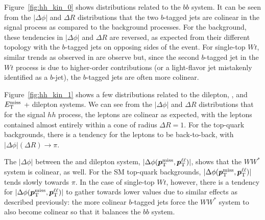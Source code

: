 Figure~\ref{fig:hh_kin_0} shows distributions related to the $bb$ system.
It can be seen from the $|\Delta \phi|$ and $\Delta R$ distributions that the two $b$-tagged jets
are colinear in the signal process as compared to the background processes.
For the \ttbar background, these tendencies in $|\Delta \phi|$ and $\Delta R$ are reversed,
as expected from their different topology with the $b$-tagged jets on opposing sides of the event.
For single-top $Wt$, similar trends as observed in \ttbar are observe but, since the second $b$-tagged
jet in the $Wt$ process is due to higher-order contributions (or a light-flavor jet mistakenly identified as a $b$-jet),
the $b$-tagged jets are often more colinear.

Figure~\ref{fig:hh_kin_1} shows a few distributions related to the dilepton, \met, and $E_{\text{T}}^{\text{miss}}$ + dilepton systems.
We can see from the $|\Delta \phi|$ and $\Delta R$ distributions that for the signal $hh$ process, the leptons
are colinear as expected, with the leptons contained almost entirely within a cone of radius $\Delta R = 1$.
For the top-quark backgrounds, there is a tendency for the leptons to be back-to-back, with $|\Delta \phi| (\Delta R) \rightarrow \pi$.

The $|\Delta \phi|$ between the \met and dilepton system, $|\Delta \phi (\bm{p}_{\text{T}}^{\text{miss}}, \bm{p}_{\text{T}}^{\ell\ell})|$, shows that the $WW^*$ system is colinear, as well.
For the SM top-quark backgrounds, $|\Delta \phi (\bm{p}_{\text{T}}^{\text{miss}}, \bm{p}_{\text{T}}^{\ell\ell})|$ tends slowly towards $\pi$.
In the case of single-top $Wt$, however, there is a tendency for $|\Delta \phi (\bm{p}_{\text{T}}^{\text{miss}}, \bm{p}_{\text{T}}^{\ell\ell})|$ to gather towards lower values due
to similar effects as described previously: the more colinear $b$-tagged jets force the
$WW^*$ system to also become colinear so that it balances the $bb$ system.

